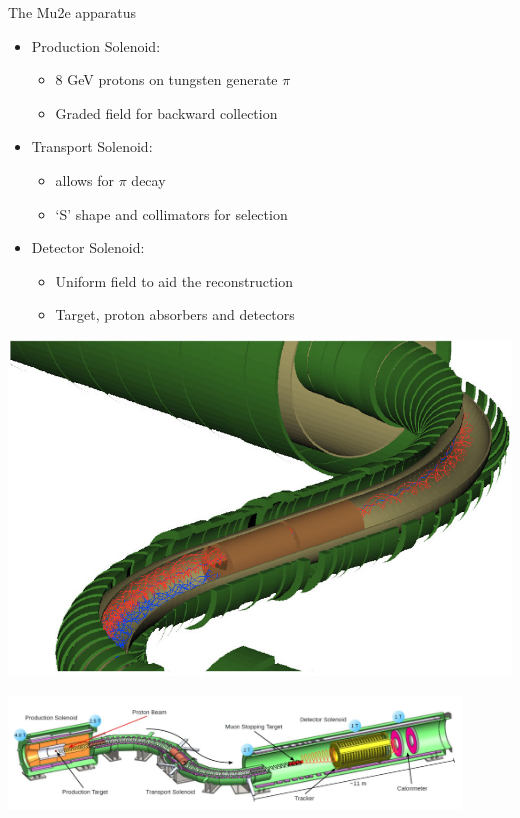 \documentclass[10pt]{beamer}
\begin{document}
%
\begin{frame}{The Mu2e apparatus}
\begin{minipage}{.6\textwidth}
\begin{itemize}
\setlength\itemsep{0.2cm}
\item Production Solenoid:
\begin{itemize}
\setlength\itemsep{0.1cm}
\item 8 GeV protons on tungsten generate $\pi$
\item Graded field for backward collection
\end{itemize}
\item Transport Solenoid:
\begin{itemize}
\setlength\itemsep{0.1cm}
\item allows for $\pi$ decay
\item `S' shape and collimators for selection
\end{itemize}
\item Detector Solenoid:
\begin{itemize}
\setlength\itemsep{0.1cm}
\item Uniform field to aid the reconstruction
\item Target, proton absorbers and detectors
\end{itemize}
\end{itemize}
\end{minipage}
\begin{minipage}{0.39\textwidth}
    \centering
    \includegraphics[width=1\textwidth]{MuonBeamline_TS_window_2}
\end{minipage}

\centering
\includegraphics[width=0.9\textwidth]{mu2e_apparatus}
\end{frame}
\end{document}
